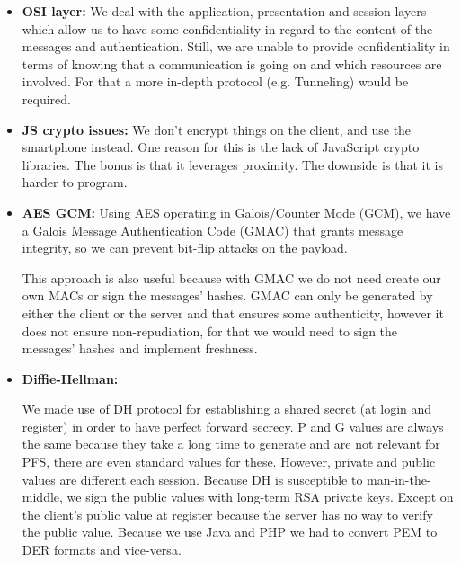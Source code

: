\documentclass[12pt]{article}
\begin{document}
\begin{itemize}
  \item \textbf{OSI layer:} We deal with the application, presentation and session layers which allow us to have some confidentiality in regard to the content of the messages and authentication. Still, we are unable to provide confidentiality in terms of knowing that a communication is going on and which resources are involved. For that a more in-depth protocol (e.g. Tunneling) would be required.
  
  \item \textbf{JS crypto issues:} We don't encrypt things on the client, and use the smartphone instead. One reason for this is the lack of JavaScript crypto libraries. The bonus is that it leverages proximity. The downside is that it is harder to program.
  
  \item \textbf{AES GCM:} Using AES operating in Galois/Counter Mode (GCM), we have a Galois Message Authentication Code (GMAC) that grants message integrity, so we can prevent bit-flip attacks on the payload.
  
  This approach is also useful because with GMAC we do not need create our own MACs or sign the messages' hashes. GMAC can only be generated by either the client or the server and that ensures some authenticity, however it does not ensure non-repudiation, for that we would need to sign the messages' hashes and implement freshness.

  \item \textbf{Diffie-Hellman:} 
  
  We made use of DH protocol for establishing a shared secret (at login and register) in order to have perfect forward secrecy. P and G values are always the same because they take a long time to generate and are not relevant for PFS, there are even standard values for these. However, private and public values are different each session. Because DH is susceptible to man-in-the-middle, we sign the public values with long-term RSA private keys. Except on the client's public value at register because the server has no way to verify the public value. Because we use Java and PHP we had to convert PEM to DER formats and vice-versa.
\end{itemize}
\end{document}
